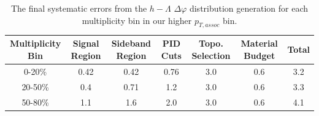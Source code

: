 \documentclass[ALICE,manyauthors]{ALICE_analysis_notes}
\begin{document}
\begin{table}[ht]
\centering
\begin{tabular}{|c||c|c|c|c|c||c|}
\hline
Multiplicity Bin & Signal Region & Sideband Region & PID Cuts & Topo. Selection & Material Budget & Total \\
\hline
0-20\% & 0.42 & 0.42 & 0.76 & 3.0 & 0.6 & 3.2 \\
20-50\% & 0.4 & 0.71 & 1.2 & 3.0  & 0.6 & 3.3 \\
50-80\% & 1.1 & 1.6 & 2.0 & 3.0  & 0.6 & 4.1 \\
\hline
\end{tabular}
\caption{The final systematic errors from the $h-\Lambda$ $\Delta\varphi$ distribution generation for each multiplicity bin in our higher $p_{T, assoc}$ bin.}
\label{dphi_systematics_table_highpt}
\end{table}

\clearpage
\end{document}
